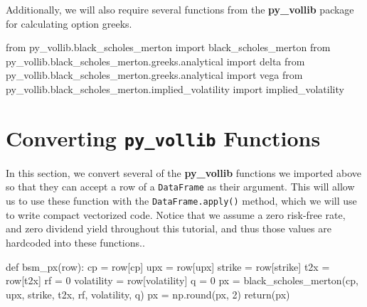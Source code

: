 \documentclass[
  letterpaper,
  DIV=11,
  numbers=noendperiod]{scrreprt}
\newenvironment{Shaded}{\begin{snugshade}}{\end{snugshade}}
\newcommand{\BuiltInTok}[1]{\textcolor[rgb]{0.00,0.23,0.31}{#1}}
\newcommand{\ControlFlowTok}[1]{\textcolor[rgb]{0.00,0.23,0.31}{#1}}
\newcommand{\DecValTok}[1]{\textcolor[rgb]{0.68,0.00,0.00}{#1}}
\newcommand{\ImportTok}[1]{\textcolor[rgb]{0.00,0.46,0.62}{#1}}
\newcommand{\KeywordTok}[1]{\textcolor[rgb]{0.00,0.23,0.31}{#1}}
\newcommand{\NormalTok}[1]{\textcolor[rgb]{0.00,0.23,0.31}{#1}}
\newcommand{\OperatorTok}[1]{\textcolor[rgb]{0.37,0.37,0.37}{#1}}
\newcommand{\StringTok}[1]{\textcolor[rgb]{0.13,0.47,0.30}{#1}}
\begin{document}
Additionally, we will also require several functions from the
\textbf{py\_vollib} package for calculating option greeks.

\begin{Shaded}
\begin{Highlighting}[]
\ImportTok{from}\NormalTok{ py\_vollib.black\_scholes\_merton }\ImportTok{import}\NormalTok{ black\_scholes\_merton}
\ImportTok{from}\NormalTok{ py\_vollib.black\_scholes\_merton.greeks.analytical }\ImportTok{import}\NormalTok{ delta}
\ImportTok{from}\NormalTok{ py\_vollib.black\_scholes\_merton.greeks.analytical }\ImportTok{import}\NormalTok{ vega}
\ImportTok{from}\NormalTok{ py\_vollib.black\_scholes\_merton.implied\_volatility }\ImportTok{import}\NormalTok{ implied\_volatility}
\end{Highlighting}
\end{Shaded}

\hypertarget{converting-py_vollib-functions}{%
\section{\texorpdfstring{Converting \texttt{py\_vollib}
Functions}{Converting py\_vollib Functions}}\label{converting-py_vollib-functions}}

In this section, we convert several of the \textbf{py\_vollib} functions
we imported above so that they can accept a row of a \texttt{DataFrame}
as their argument. This will allow us to use these function with the
\texttt{DataFrame.apply()} method, which we will use to write compact
vectorized code. Notice that we assume a zero risk-free rate, and zero
dividend yield throughout this tutorial, and thus those values are
hardcoded into these functions..

\begin{Shaded}
\begin{Highlighting}[]
\KeywordTok{def}\NormalTok{ bsm\_px(row):}
\NormalTok{    cp }\OperatorTok{=}\NormalTok{ row[}\StringTok{\textquotesingle{}cp\textquotesingle{}}\NormalTok{]}
\NormalTok{    upx }\OperatorTok{=}\NormalTok{ row[}\StringTok{\textquotesingle{}upx\textquotesingle{}}\NormalTok{]}
\NormalTok{    strike }\OperatorTok{=}\NormalTok{ row[}\StringTok{\textquotesingle{}strike\textquotesingle{}}\NormalTok{]}
\NormalTok{    t2x }\OperatorTok{=}\NormalTok{ row[}\StringTok{\textquotesingle{}t2x\textquotesingle{}}\NormalTok{]}
\NormalTok{    rf }\OperatorTok{=} \DecValTok{0}
\NormalTok{    volatility }\OperatorTok{=}\NormalTok{ row[}\StringTok{\textquotesingle{}volatility\textquotesingle{}}\NormalTok{]}
\NormalTok{    q }\OperatorTok{=} \DecValTok{0}
\NormalTok{    px }\OperatorTok{=}\NormalTok{ black\_scholes\_merton(cp, upx, strike, t2x, rf, volatility, q)}
\NormalTok{    px }\OperatorTok{=}\NormalTok{ np.}\BuiltInTok{round}\NormalTok{(px, }\DecValTok{2}\NormalTok{)}
    \ControlFlowTok{return}\NormalTok{(px)}
\end{Highlighting}
\end{Shaded}
\end{document}
